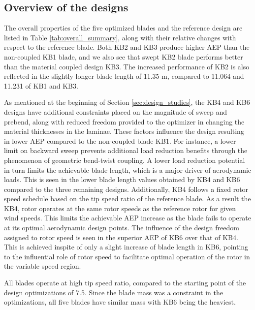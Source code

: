 \subsection{Overview of the designs}
\label{subsec:design_overview}
The overall properties of the five optimized blades and the reference design are listed in Table \ref{tab:overall_summary}, along with their relative changes with respect to the reference blade.
Both KB2 and KB3 produce higher AEP than the non-coupled KB1 blade, and we also see that swept KB2 blade performs better than the material coupled design KB3. The increased performance of KB2 is also reflected in the slightly longer blade length of 11.35 m, compared to 11.064 and 11.231 of KB1 and KB3.


As mentioned at the beginning of Section \ref{sec:design_studies}, the KB4 and KB6 designs have additional constraints placed on the magnitude of sweep and prebend, along with reduced freedom provided to the optimizer in changing the material thicknesses in the laminae. These factors influence the design resulting in lower AEP compared to the non-coupled blade KB1. For instance, a lower limit on backward sweep prevents additional load reduction benefits through the phenomenon of geometric bend-twist coupling. A lower load reduction potential in turn limits the achievable blade length, which is a major driver of aerodynamic loads. This is seen in the lower blade length values obtained by KB4 and KB6 compared to the three remaining designs. Additionally, KB4 follows a fixed rotor speed schedule based on the tip speed ratio of the reference blade. As a result the KB4, rotor operates at the same rotor speeds as the reference rotor for given wind speeds. This limits the achievable AEP increase as the blade fails to operate at its optimal aerodynamic design points. The influence of the design freedom assigned to rotor speed is seen in the superior AEP of KB6 over that of KB4. This is achieved inspite of only a slight increase of blade length in KB6, pointing to the influential role of rotor speed to facilitate optimal operation of the rotor in the variable speed region.

All blades operate at high tip speed ratio, compared to the starting point of the design optimizations of 7.5. Since the blade mass was a constraint in the optimizations, all five blades have similar mass with KB6 being the heaviest.


